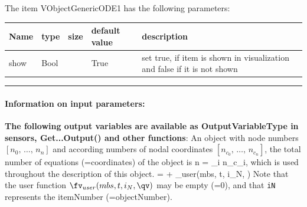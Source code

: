 The item VObjectGenericODE1 has the following parameters:\vspace{-1cm}\\ 
\begin{center}
  \footnotesize
  \begin{longtable}{| p{4.5cm} | p{2.5cm} | p{0.5cm} | p{2.5cm} | p{6cm} |}
    \hline
    \bf Name & \bf type & \bf size & \bf default value & \bf description \\ \hline
    show &     Bool &      &     True &     set true, if item is shown in visualization and false if it is not shown\\ \hline
	  \end{longtable}
	\end{center}
\par\noindent\rule{\textwidth}{0.4pt}
\label{description_ObjectGenericODE1}
\paragraph{Information on input parameters:} 
\finishTable
{\bf The following output variables are available as OutputVariableType in sensors, Get...Output() and other functions}: 
\finishTable
 \noindent
    An object with node numbers $[n_0,\,\ldots,\,n_n]$ and according numbers of nodal coordinates $[n_{c_0},\,\ldots,\,n_{c_n}]$, the total number of equations (=coordinates) of the object is
    \be
      n = \sum_{i} n_{c_i},
    \ee
    which is used throughout the description of this object.
    \be \label{eq_ObjectGenericODE1_EOM}
      \dot \qv = \fv + \fv_{user}(mbs, t, i_N, \qv)
    \ee
    Note that the user function $\fv_{user}(mbs, t, i_N, \qv)$ may be empty (=0), and that \texttt{iN} represents the itemNumber (=objectNumber). 

